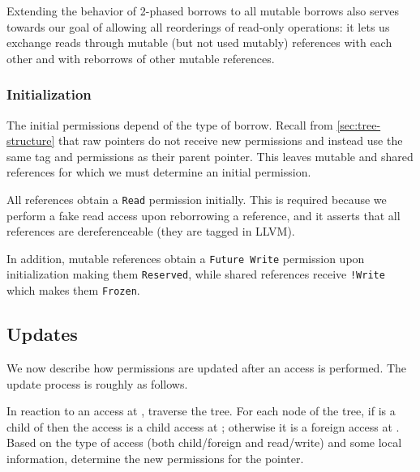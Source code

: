 \documentclass[a4paper,11pt]{article}
\theoremstyle{plain}
\theoremstyle{definition}
\theoremstyle{remark}
\newcommand{\tcode}[1]{\rstinline{#1}}
\newcommand{\tperm}[1]{\texttt{#1}}
\begin{document}
Extending the behavior of 2-phased borrows to all mutable borrows also serves
towards our goal of allowing all reorderings of read-only operations: it lets
us exchange reads through mutable (but not used mutably) references with each
other and with reborrows of other mutable references.

\subsubsection{Initialization}

The initial permissions depend of the type of borrow.
Recall from \ref{sec:tree-structure} that raw pointers do not receive new permissions and instead
use the same tag and permissions as their parent pointer. This leaves mutable and
shared references for which we must determine an initial permission.

All references obtain a \tperm{Read} permission initially. This is required
because we perform a fake read access upon reborrowing a reference, and it asserts
that all references are dereferenceable (they are tagged \tcode{dereferenceable}
in LLVM).

In addition, mutable references obtain a \tperm{Future Write} permission upon initialization
making them \tperm{Reserved}, while shared references receive \tperm{!Write} which makes them \tperm{Frozen}.

\subsection{Updates}
\label{sec:transitions}

We now describe how permissions are updated after an access is performed.
The update process is roughly as follows.

In reaction to an access at \tcode{t0}, traverse the tree. For each \tcode{t1} node of the
tree, if \tcode{t0} is a child of \tcode{t1} then the access is a child access at \tcode{t1}; otherwise
it is a foreign access at \tcode{t1}. Based on the type of access (both child/foreign
and read/write) and some local information, determine the new permissions for the
pointer.
\end{document}
